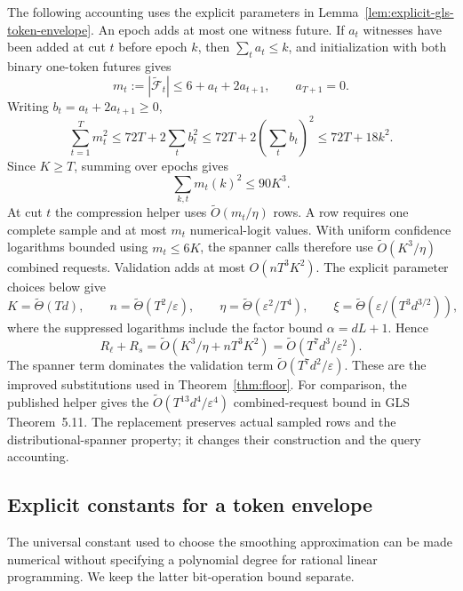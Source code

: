 \documentclass[11pt]{article}
\theoremstyle{definition}
\theoremstyle{remark}
\begin{document}
The following accounting uses the explicit parameters in Lemma~\ref{lem:explicit-gls-token-envelope}. An epoch adds at most one witness future. If $a_t$ witnesses have been added at cut $t$ before epoch $k$, then $\sum_ta_t\le k$, and initialization with both binary one-token futures gives
\[
m_t:=|\tilde{\mathcal F}_t|\le6+a_t+2a_{t+1},\qquad a_{T+1}=0.
\]
Writing $b_t=a_t+2a_{t+1}\ge0$,
\[
\sum_{t=1}^Tm_t^2
\le72T+2\sum_tb_t^2
\le72T+2\left(\sum_tb_t\right)^2
\le72T+18k^2.
\]
Since $K\ge T$, summing over epochs gives
\begin{equation}\label{eq:global-future-dimension}
\sum_{k,t}m_t(k)^2\le90K^3.
\end{equation}
At cut $t$ the compression helper uses $\widetilde O(m_t/\eta)$ rows. A row requires one complete sample and at most $m_t$ numerical-logit values. With uniform confidence logarithms bounded using $m_t\le6K$, the spanner calls therefore use $\widetilde O(K^3/\eta)$ combined requests. Validation adds at most $O(nT^3K^2)$. The explicit parameter choices below give
\[
K=\widetilde\Theta(Td),\qquad
n=\widetilde\Theta(T^2/\varepsilon),\qquad
\eta=\widetilde\Theta(\varepsilon^2/T^4),\qquad
\xi=\widetilde\Theta(\varepsilon/(T^3d^{3/2})),
\]
where the suppressed logarithms include the factor bound $\alpha=dL+1$. Hence
\begin{equation}\label{eq:improved-gls-queries}
R_\ell+R_s
=\widetilde O\!\left(K^3/\eta+nT^3K^2\right)
=\widetilde O(T^7d^3/\varepsilon^2).
\end{equation}
The spanner term dominates the validation term $\widetilde O(T^7d^2/\varepsilon)$. These are the improved substitutions used in Theorem~\ref{thm:floor}. For comparison, the published helper gives the $\widetilde O(T^{13}d^4/\varepsilon^4)$ combined-request bound in GLS Theorem~5.11. The replacement preserves actual sampled rows and the distributional-spanner property; it changes their construction and the query accounting.

\subsection{Explicit constants for a token envelope}\label{sec:explicit-token-envelope}

The universal constant used to choose the smoothing approximation can be made numerical without specifying a polynomial degree for rational linear programming. We keep the latter bit-operation bound separate.
\end{document}
